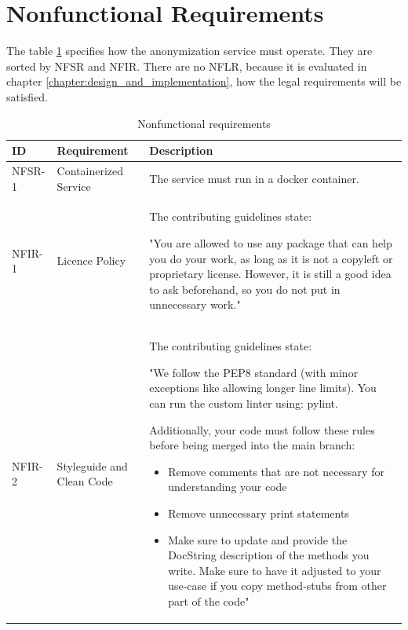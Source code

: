 \section{Nonfunctional Requirements}
\label{sec:nonfunctional_requirements}

The table \ref{tab:nonfunctional_requirements} specifies how the anonymization service must operate.
They are sorted by \ac{NFSR} and \ac{NFIR}. There are no \ac{NFLR}, because it is evaluated in chapter \ref{chapter:design_and_implementation}, how the legal requirements will be satisfied.

 \begin{table}[ht]
 	\caption{Nonfunctional requirements}
 	\label{tab:nonfunctional_requirements}
 	\begin{tabular}{|l|l|p{7cm}|}
 		\hline
 		ID & Requirement & Description \\
 		\hline
 		NFSR-1 & Containerized Service & 
 		The service must run in a docker container. \\
 		\hline
 		NFIR-1 & Licence Policy & 
 		The contributing guidelines \autocite{github_mecois} state:
 		
 		"You are allowed to use any package that can help you do your work, as long as it is not a copyleft or proprietary license. However, it is still a good idea to ask beforehand, so you do not put in unnecessary work." \\
 		\hline
 		NFIR-2 & Styleguide and Clean Code & 
 		The contributing guidelines \autocite{github_mecois} state:
 		
 		"We follow the PEP8 standard (with minor exceptions like allowing longer line limits). You can run the custom linter using: pylint.
 		
 		Additionally, your code must follow these rules before being merged into the main branch:
 		
 		\begin{itemize}
 		\item Remove comments that are not necessary for understanding your code
 		\item Remove unnecessary print statements
 		\item Make sure to update and provide the DocString description of the methods you write. Make sure to have it adjusted to your use-case if you copy method-stubs from other part of the code"
 		\end{itemize}\\
 		\hline
 	\end{tabular}
 \end{table}